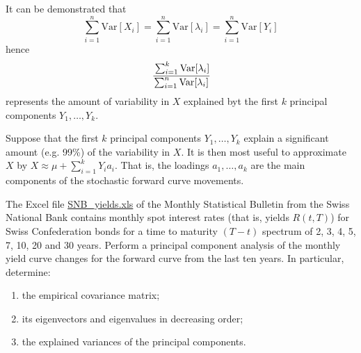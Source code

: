 \documentclass[12pt,a4paper]{article}
\begin{document}
It can be demonstrated that 
\begin{equation}
\sum_{i=1}^n\text{Var}[X_i] = \sum_{i=1}^n\text{Var}[\lambda_i] = \sum_{i=1}^n\text{Var}[Y_i]
\end{equation}
hence
\begin{equation}
\cfrac{\sum_{i=1}^k\text{Var}[\lambda_i]}{\sum_{i=1}^n\text{Var}[\lambda_i]}
\end{equation}
represents the amount of variability in $X$ explained byt the first $k$ principal components $Y_1,\ldots,Y_k$.

Suppose that the first $k$ principal components $Y_1,\ldots,Y_k$ explain a significant amount (e.g. 99\%) of the variability in $X$. It is then most useful to
approximate $X$ by $X\approx\mu +\sum_{i=1}^{k}Y_ia_i$. That is, the loadings $a_1,\ldots, a_k$ are the main components of the stochastic forward curve movements.

\begin{question}
The Excel file \href{https://github.com/matteosan1/finance_course/raw/develop/input_files/SNB_yields.xlsx}{SNB\_yields.xls} of the Monthly Statistical Bulletin from the Swiss National Bank contains monthly spot interest rates (that is, yields $R(t,T)$) for Swiss Confederation bonds for a time to maturity $(T-t)$ spectrum of 2, 3, 4, 5, 7, 10, 20 and 30 years. 
Perform a principal component analysis of the monthly yield curve changes for the forward curve from the last ten years. In particular, determine:
\begin{enumerate}
\item the empirical covariance matrix;
\item its eigenvectors and eigenvalues in decreasing order;
\item the explained variances of the principal components.
\end{enumerate}
\end{question}

\tableofcontents
\end{document}
